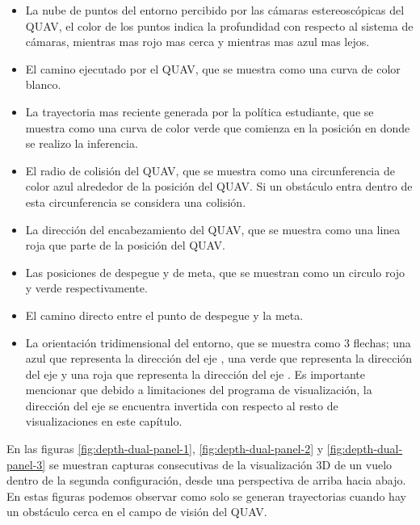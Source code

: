 \begin{itemize}
    \item La nube de puntos del entorno percibido por las cámaras estereoscópicas del QUAV, el color de los puntos indica la profundidad con respecto al sistema de cámaras, mientras mas rojo mas cerca y mientras mas azul mas lejos.
    \item El camino ejecutado por el QUAV, que se muestra como una curva de color blanco.
    \item La trayectoria mas reciente generada por la política estudiante, que se muestra como una curva de color verde que comienza en la posición en donde se realizo la inferencia.
    \item El radio de colisión del QUAV, que se muestra como una circunferencia de color azul alrededor de la posición del QUAV. Si un obstáculo entra dentro de esta circunferencia se considera una colisión.
    \item La dirección del encabezamiento del QUAV, que se muestra como una linea roja que parte de la posición del QUAV.
    \item Las posiciones de despegue y de meta, que se muestran como un circulo rojo y verde respectivamente.
    \item El camino directo entre el punto de despegue y la meta.
    \item La orientación tridimensional del entorno, que se muestra como 3 flechas; una azul que representa la dirección del eje , una verde que representa la dirección del eje  y una roja que representa la dirección del eje . Es importante mencionar que debido a limitaciones del programa de visualización, la dirección del eje  se encuentra invertida con respecto al resto de visualizaciones en este capítulo.
\end{itemize}

En las figuras \ref{fig:depth-dual-panel-1}, \ref{fig:depth-dual-panel-2} y \ref{fig:depth-dual-panel-3} se muestran capturas consecutivas de la visualización 3D de un vuelo dentro de la segunda configuración, desde una perspectiva de arriba hacia abajo. En estas figuras podemos observar como solo se generan trayectorias cuando hay un obstáculo cerca en el campo de visión del QUAV.

